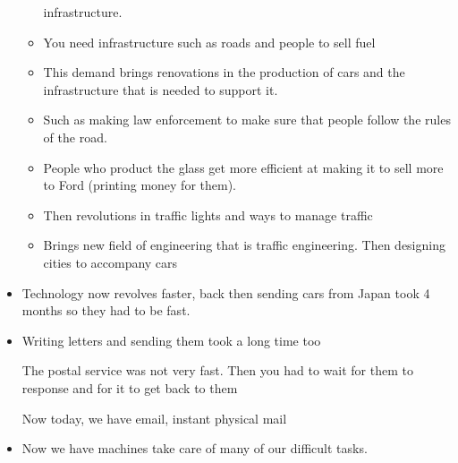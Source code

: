 \documentclass{article}
\begin{document}
\begin{itemize}
\begin{itemize}
        infrastructure.
      \item You need infrastructure such as roads
        and people to sell fuel
      \item This demand brings renovations in the
        production of cars and the infrastructure
        that is needed to support it.
      \item Such as making law enforcement
        to make sure that people follow the rules
        of the road.
      \item People who product the glass
        get more efficient at making it to sell
        more to Ford (printing money for them).
      \item Then revolutions in traffic lights and
        ways to manage traffic
      \item Brings new field of engineering that
        is traffic engineering. Then designing
        cities to accompany cars
    \end{itemize}
  \item Technology now revolves faster, back then
    sending cars from Japan took 4 months so they had to be
    fast.
  \item Writing letters and sending them took a long time too

    The postal service was not very fast. Then
    you had to wait for them to response and for it
    to get back to them

    Now today, we have email, instant physical mail
  \item Now we have machines take care of many of our difficult
    tasks.
\end{itemize}
\end{document}
